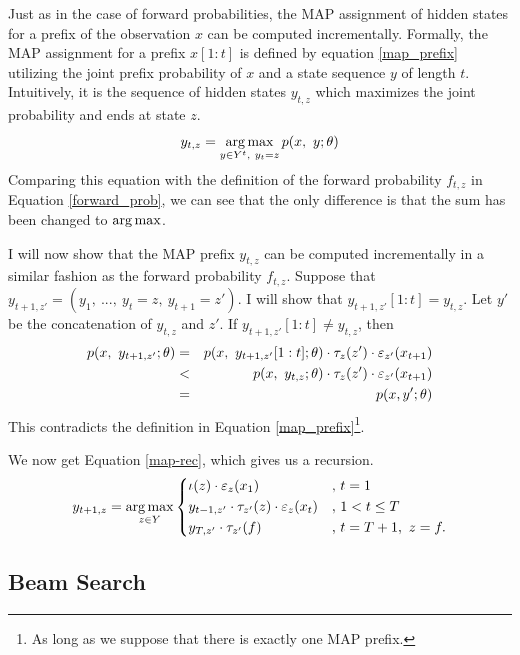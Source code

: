 Just as in the case of forward probabilities, the MAP assignment of
hidden states for a prefix of the observation $x$ can be computed
incrementally. Formally, the MAP assignment for a prefix $x[1:t]$ is
defined by equation \eqref{map_prefix} utilizing the joint prefix
probability of $x$ and a state sequence $y$ of length
$t$. Intuitively, it is the sequence of hidden states $y_{t, z}$ which
maximizes the joint probability and ends at state $z$.
\begin{equation}
y_{t,z} = \operatorname*{arg\,max}_{y\in Y^t,\ y_t = z} p(x,\ y\mbox{$ ; \, $} \theta)\label{map_prefix}
\end{equation}
Comparing this equation with the definition of the forward probability
$f_{t,z}$ in Equation \ref{forward_prob}, we can see that the only
difference is that the sum has been changed to $\operatorname*{arg\,max}$.

I will now show that the MAP prefix $y_{t,z}$ can be computed
incrementally in a similar fashion as the forward probability
$f_{t,z}$. Suppose that $y_{t+1, z'} = (y_1,\ ...,\ y_t = z,\ y_{t+1}
= z')$. I will show that $y_{t+1, z'}[1:t] = y_{t,z}$. Let $y'$ be the concatenation of $y_{t,z}$ and $z'$. If $y_{t+1,z'}[1:t] \ne y_{t,z}$, then
\begin{eqnarray*}
p(x,\ y_{t+1,z'}\parcond \theta) & = & p(x,\ y_{t+1,z'}[1:t]\parcond \theta) \cdot \tau_z(z')\cdot\varepsilon_{z'}(x_{t+1})\\ 
                                 & < & p(x,\ y_{t,z}\parcond \theta) \cdot \tau_z(z')\cdot\varepsilon_{z'}(x_{t+1})\\
                                 & = & p(x, y'\parcond\theta)
\end{eqnarray*}
This contradicts the definition in Equation \eqref{map_prefix}\footnote{As long as we suppose that there is exactly one MAP prefix.}.

We now get Equation \eqref{map-rec}, which gives us a recursion.
\begin{equation}
y_{t+1, z} = \operatorname*{arg\,max}_{z \in Y}\left\{
\begin{aligned}
&\iota(z) \cdot \varepsilon_{z}(x_1)  & , &\  t = 1\\
&y_{t - 1, z'}\cdot \tau_{z'}(z) \cdot \varepsilon_{z}(x_{t}) & ,&\ 1 < t \le T\\
&y_{T, z'}\cdot \tau_{z'}(f) & ,&\  t = T + 1,\ z = f.
\end{aligned}
\right.
\label{map-rec}
\end{equation}

\subsection{Beam Search}

